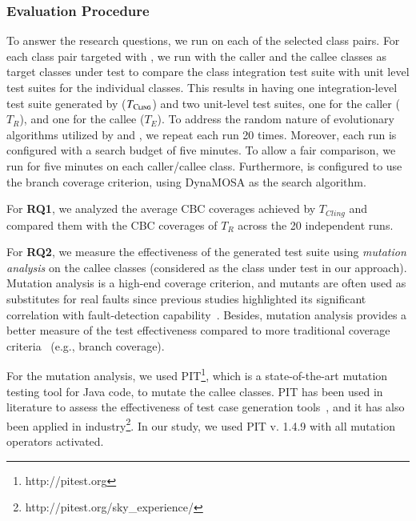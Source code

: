 

\subsubsection{Evaluation Procedure}
To answer the research questions, we run \cling on each of the selected class pairs. For each class pair targeted with \cling, we run \evosuite with the caller and the callee classes as target classes under test to compare the class integration test suite with unit level test suites for the individual classes. This results in having one integration-level test suite generated by \cling ($T_{\textsc{Cling}}$) and two unit-level test suites, one for the caller ($T_{R}$), and one for the callee ($T_{E}$). To address the random nature of evolutionary algorithms utilized by \cling and \evosuite, we repeat each run 20 times. Moreover, each \cling run is configured with a search budget of five minutes.  To allow a fair comparison, we run \evosuite for five minutes on each caller/callee class. Furthermore, \evosuite is configured to use the branch coverage criterion, using DynaMOSA as the search algorithm. 


For \textbf{RQ1}, we analyzed the average CBC coverages achieved by $T_{Cling}$ and compared them with the CBC coverages of $T_{R}$ across the 20 independent runs.


For \textbf{RQ2}, we measure the effectiveness of the generated test suite using \textit{mutation analysis} on the callee classes (considered as the class under test in our approach). Mutation analysis is a high-end coverage criterion, and mutants are often used as substitutes for real faults since previous studies highlighted its significant correlation with fault-detection capability~\cite{just2014mutants, andrews2005mutation}. Besides, mutation analysis provides a better measure of the test effectiveness compared to more traditional coverage criteria~\cite{wei2012branch} (e.g., branch coverage).

For the mutation analysis, we used PIT\footnote{http://pitest.org}, which is a state-of-the-art mutation testing tool for Java code, to mutate the callee classes. PIT has been used in literature to assess the effectiveness of test case generation tools~\cite{ma2015grt, panichella2017java, molina2018java, kifetew2019java}, and it has also been applied in industry\footnote{http://pitest.org/sky\_experience/}. In our study, we used PIT v. 1.4.9 with all mutation operators activated.

